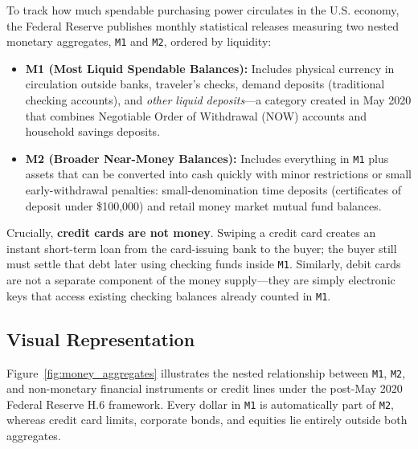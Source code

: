 \documentclass[11pt, oneside]{book}
\begin{document}
To track how much spendable purchasing power circulates in the U.S. economy, the Federal Reserve publishes monthly statistical releases measuring two nested monetary aggregates, \texttt{M1} and \texttt{M2}, ordered by liquidity:
\begin{itemize}[leftmargin=1.5em, itemsep=3pt]
  \item \textbf{M1 (Most Liquid Spendable Balances):} Includes physical currency in circulation outside banks, traveler's checks, demand deposits (traditional checking accounts), and \emph{other liquid deposits}—a category created in May 2020 that combines Negotiable Order of Withdrawal (NOW) accounts and household savings deposits.
  \item \textbf{M2 (Broader Near-Money Balances):} Includes everything in \texttt{M1} plus assets that can be converted into cash quickly with minor restrictions or small early-withdrawal penalties: small-denomination time deposits (certificates of deposit under \$100,000) and retail money market mutual fund balances.
\end{itemize}

Crucially, \textbf{credit cards are not money}. Swiping a credit card creates an instant short-term loan from the card-issuing bank to the buyer; the buyer still must settle that debt later using checking funds inside \texttt{M1}. Similarly, debit cards are not a separate component of the money supply—they are simply electronic keys that access existing checking balances already counted in \texttt{M1}.

\subsection*{Visual Representation}

Figure~\ref{fig:money_aggregates} illustrates the nested relationship between \texttt{M1}, \texttt{M2}, and non-monetary financial instruments or credit lines under the post-May 2020 Federal Reserve H.6 framework. Every dollar in \texttt{M1} is automatically part of \texttt{M2}, whereas credit card limits, corporate bonds, and equities lie entirely outside both aggregates.
\end{document}
